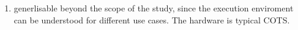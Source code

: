\begin{enumerate}
\item generlisable beyond the scope of the study, since the execution enviroment can be understood for different use cases. The hardware is typical COTS. 
\end{enumerate}







% 


